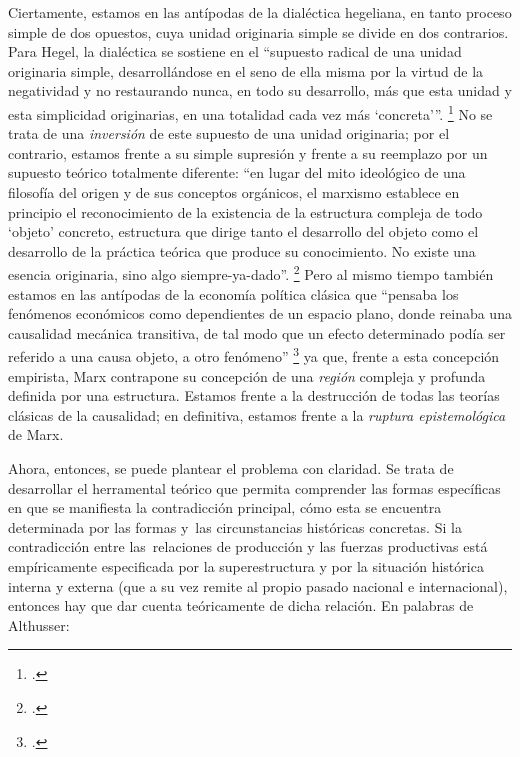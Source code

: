 Ciertamente, estamos en las antípodas de la dialéctica hegeliana, en tanto proceso simple de dos opuestos, cuya unidad originaria simple se divide en dos contrarios. Para Hegel, la dialéctica se sostiene en el \enquote{supuesto radical de una unidad originaria simple, desarrollándose en el seno de ella misma por la virtud de la negatividad y no restaurando nunca, en todo su desarrollo, más que esta unidad y esta simplicidad originarias, en una totalidad cada vez más \enquote{concreta}}. \footcite[][163]{@7051-ALTHUSSER1965} No se trata de una \emph{inversión} de este supuesto de una unidad originaria; por el contrario, estamos frente a su simple supresión y frente a su reemplazo por un supuesto teórico totalmente diferente: \enquote{en lugar del mito ideológico de una filosofía del origen y de sus conceptos orgánicos, el marxismo establece en principio el reconocimiento de la existencia de la estructura compleja de todo \enquote{objeto} concreto, estructura que dirige tanto el desarrollo del objeto como el desarrollo de la práctica teórica que produce su conocimiento. No existe una esencia originaria, sino algo siempre-ya-dado}. \footcite[][164]{@7051-ALTHUSSER1965} Pero al mismo tiempo también estamos en las antípodas de la economía política clásica que \enquote{pensaba los fenómenos económicos como dependientes de un espacio plano, donde reinaba una causalidad mecánica transitiva, de tal modo que un efecto determinado podía ser referido a una causa objeto, a otro fenómeno} \footcite[][197]{@7051-ALTHUSSER1965} ya que, frente a esta concepción empirista, Marx contrapone su concepción de una \emph{región} compleja y profunda definida por una estructura. Estamos frente a la destrucción de todas las teorías clásicas de la causalidad; en definitiva, estamos frente a la \emph{ruptura epistemológica} de Marx.

Ahora, entonces, se puede plantear el problema con claridad.  \linebreak Se trata de desarrollar el herramental teórico que permita comprender las formas específicas en que se manifiesta la contradicción principal, cómo esta se encuentra determinada por las formas y~las circunstancias históricas concretas. Si la contradicción entre las~relaciones de producción y las fuerzas productivas está empíricamente especificada por la superestructura y por la situación histórica interna y externa (que a su vez remite al propio pasado nacional e internacional), entonces hay que dar cuenta teóricamente de dicha relación. En palabras de Althusser:


